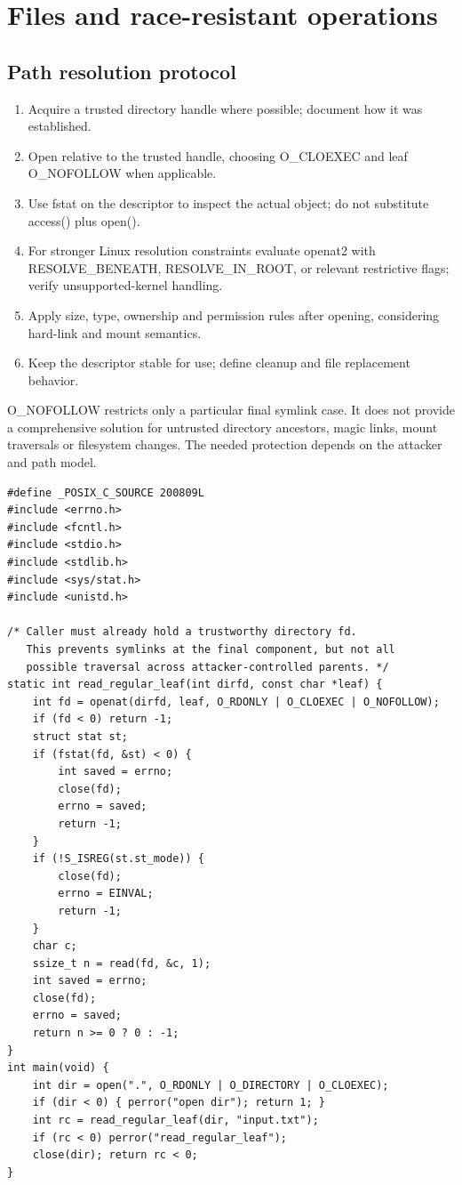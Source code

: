 \documentclass[11pt,letterpaper,oneside]{report}
\begin{document}
\chapter{Files and race-resistant operations}
\section{Path resolution protocol}
\begin{enumerate}
\item Acquire a trusted directory handle where possible; document how it was established.
\item Open relative to the trusted handle, choosing O\_CLOEXEC and leaf O\_NOFOLLOW when applicable.
\item Use fstat on the descriptor to inspect the actual object; do not substitute access() plus open().
\item For stronger Linux resolution constraints evaluate openat2 with RESOLVE\_BENEATH, RESOLVE\_IN\_ROOT, or relevant restrictive flags; verify unsupported-kernel handling.
\item Apply size, type, ownership and permission rules after opening, considering hard-link and mount semantics.
\item Keep the descriptor stable for use; define cleanup and file replacement behavior.
\end{enumerate}
O\_NOFOLLOW restricts only a particular final symlink case. It does not provide a comprehensive solution for untrusted directory ancestors, magic links, mount traversals or filesystem changes. The needed protection depends on the attacker and path model.

\begin{lstlisting}
#define _POSIX_C_SOURCE 200809L
#include <errno.h>
#include <fcntl.h>
#include <stdio.h>
#include <stdlib.h>
#include <sys/stat.h>
#include <unistd.h>

/* Caller must already hold a trustworthy directory fd.
   This prevents symlinks at the final component, but not all
   possible traversal across attacker-controlled parents. */
static int read_regular_leaf(int dirfd, const char *leaf) {
    int fd = openat(dirfd, leaf, O_RDONLY | O_CLOEXEC | O_NOFOLLOW);
    if (fd < 0) return -1;
    struct stat st;
    if (fstat(fd, &st) < 0) {
        int saved = errno;
        close(fd);
        errno = saved;
        return -1;
    }
    if (!S_ISREG(st.st_mode)) {
        close(fd);
        errno = EINVAL;
        return -1;
    }
    char c;
    ssize_t n = read(fd, &c, 1);
    int saved = errno;
    close(fd);
    errno = saved;
    return n >= 0 ? 0 : -1;
}
int main(void) {
    int dir = open(".", O_RDONLY | O_DIRECTORY | O_CLOEXEC);
    if (dir < 0) { perror("open dir"); return 1; }
    int rc = read_regular_leaf(dir, "input.txt");
    if (rc < 0) perror("read_regular_leaf");
    close(dir); return rc < 0;
}
\end{lstlisting}
\end{document}
